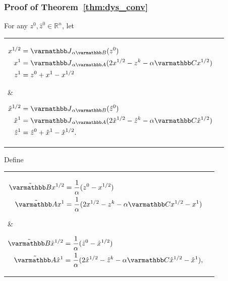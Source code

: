 \documentclass[10pt,mathserif]{beamer}
\begin{document}
\begin{frame}[fragile]
\frametitle{Proof of Theorem~\ref{thm:dys_conv}}
For any $z^0,\hat{z}^0\in \mathbb{R}^n$, let
\begin{center}
\begin{tabular}{l|l}
\parbox{0.3\linewidth}{%
\begin{align*}
x^{1/2}&=\opJ_{\alpha \opB}(z^0)\\
x^{1}&=\opJ_{\alpha \opA}(2x^{1/2}-z^k-\alpha \opC x^{1/2})\\
z^{1}&=z^0+x^{1}-x^{1/2}
\end{align*}}
&
\parbox{0.3\linewidth}{%
\begin{align*}
\hat{x}^{1/2}&=\opJ_{\alpha \opB}(\hat{z}^0)\\
\hat{x}^{1}&=\opJ_{\alpha \opA}(2\hat{x}^{1/2}-\hat{z}^k-\alpha \opC \hat{x}^{1/2})\\
\hat{z}^{1}&=\hat{z}^0+\hat{x}^{1}-\hat{x}^{1/2}.
\end{align*}}
\end{tabular}
\end{center}
Define
\begingroup\makeatletter\def\f@size{9}\check@mathfonts
\begin{center}
\begin{tabular}{l|l}
\parbox{0.45\linewidth}{%
\begin{align*}
\tilde{\opB}x^{1/2}&=\frac{1}{\alpha}(z^0-x^{1/2})\\
\tilde{\opA}x^{1}&=\frac{1}{\alpha}(2x^{1/2}-z^k-\alpha \opC x^{1/2}-x^{1})
\end{align*}}
&
\parbox{0.45\linewidth}{%
\begin{align*}
\tilde{\opB}\hat{x}^{1/2}&=\frac{1}{\alpha}(\hat{z}^0-\hat{x}^{1/2})\\
\tilde{\opA}\hat{x}^{1}&=\frac{1}{\alpha}(2\hat{x}^{1/2}-\hat{z}^k-\alpha \opC \hat{x}^{1/2}-\hat{x}^{1}),
\end{align*}}
\end{tabular}
\end{center}
\endgroup
\end{frame}
\end{document}
